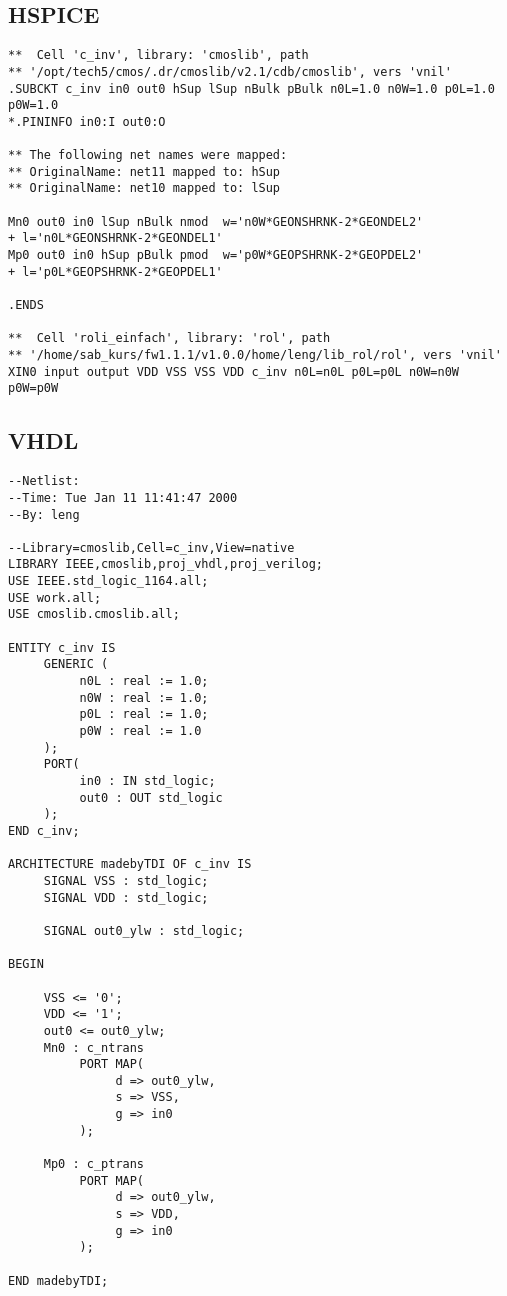 \subsection{HSPICE}
\label{table:net_hspice}

{\footnotesize
\begin{verbatim}
**  Cell 'c_inv', library: 'cmoslib', path
** '/opt/tech5/cmos/.dr/cmoslib/v2.1/cdb/cmoslib', vers 'vnil'
.SUBCKT c_inv in0 out0 hSup lSup nBulk pBulk n0L=1.0 n0W=1.0 p0L=1.0 p0W=1.0
*.PININFO in0:I out0:O

** The following net names were mapped:
** OriginalName: net11 mapped to: hSup
** OriginalName: net10 mapped to: lSup

Mn0 out0 in0 lSup nBulk nmod  w='n0W*GEONSHRNK-2*GEONDEL2'
+ l='n0L*GEONSHRNK-2*GEONDEL1'
Mp0 out0 in0 hSup pBulk pmod  w='p0W*GEOPSHRNK-2*GEOPDEL2'
+ l='p0L*GEOPSHRNK-2*GEOPDEL1'

.ENDS

**  Cell 'roli_einfach', library: 'rol', path
** '/home/sab_kurs/fw1.1.1/v1.0.0/home/leng/lib_rol/rol', vers 'vnil'
XIN0 input output VDD VSS VSS VDD c_inv n0L=n0L p0L=p0L n0W=n0W p0W=p0W
\end{verbatim}
}

\subsection{VHDL}
\label{table:net_vhdl}
{\footnotesize
\begin{verbatim}
--Netlist:
--Time: Tue Jan 11 11:41:47 2000
--By: leng

--Library=cmoslib,Cell=c_inv,View=native
LIBRARY IEEE,cmoslib,proj_vhdl,proj_verilog;
USE IEEE.std_logic_1164.all;
USE work.all;
USE cmoslib.cmoslib.all;

ENTITY c_inv IS
     GENERIC (
          n0L : real := 1.0;
          n0W : real := 1.0;
          p0L : real := 1.0;
          p0W : real := 1.0
     );
     PORT(
          in0 : IN std_logic;
          out0 : OUT std_logic
     );
END c_inv;

ARCHITECTURE madebyTDI OF c_inv IS
     SIGNAL VSS : std_logic;
     SIGNAL VDD : std_logic;

     SIGNAL out0_ylw : std_logic;

BEGIN

     VSS <= '0';
     VDD <= '1';
     out0 <= out0_ylw;
     Mn0 : c_ntrans
          PORT MAP(
               d => out0_ylw,
               s => VSS,
               g => in0
          );

     Mp0 : c_ptrans
          PORT MAP(
               d => out0_ylw,
               s => VDD,
               g => in0
          );

END madebyTDI;
\end{verbatim}
}
